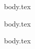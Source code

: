 
\ifdefined\wsl
{body.tex}
\fi

\ifdefined\git
\newpage
{body.tex}
\fi

\ifdefined\vscode
\newpage
{body.tex}
\fi
